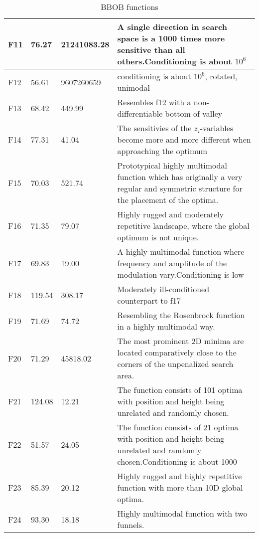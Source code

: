 \documentclass[a4paper,10pt]{article}
\begin{document}
\begin{table}[H]
{\begin{tabular}{|l|l|l|l|}
        F11 & 76.27 & 21241083.28 & A single direction in search space is a 1000 times more sensitive than all others.Conditioning is about $10^6$ \\ \hline
        F12 & 56.61 & 9607260659 & conditioning is about $10^6$, rotated, unimodal \\ \hline
        F13 & 68.42 & 449.99 & Resembles f12 with a non-differentiable bottom of valley \\ \hline
        F14 & 77.31 & 41.04 & The sensitivies of the $z_i$-variables become more and more different when approaching the optimum \\ \hline
        F15 & 70.03 & 521.74 & Prototypical highly multimodal function which has originally a very regular and symmetric structure for the placement of the optima. \\ \hline
        F16 & 71.35 & 79.07 & Highly rugged and moderately repetitive landscape, where the global optimum is not unique. \\ \hline
        F17 & 69.83 & 19.00  & A highly multimodal function where frequency and amplitude of the modulation vary.Conditioning is low \\ \hline
        F18 & 119.54 & 308.17 & Moderately ill-conditioned counterpart to f17 \\ \hline
        F19 & 71.69 & 74.72 & Resembling the Rosenbrock function in a highly multimodal way. \\ \hline
        F20 & 71.29 & 45818.02 & The most prominent 2D minima are located comparatively close to the corners of the unpenalized search area. \\ \hline
        F21 & 124.08 & 12.21 & The function consists of 101 optima with position and height being unrelated and randomly chosen. \\ \hline
        F22 & 51.57 & 24.05 & The function consists of 21 optima with position and height being unrelated and randomly chosen.Conditioning is about 1000 \\ \hline
        F23 & 85.39 & 20.12 & Highly rugged and highly repetitive function with more than 10D global optima. \\ \hline
        F24 & 93.30  & 18.18 &  Highly multimodal function with two funnels. \\ \hline
    \end{tabular}
    }
    \caption{BBOB functions}
\end{table}
\end{document}
